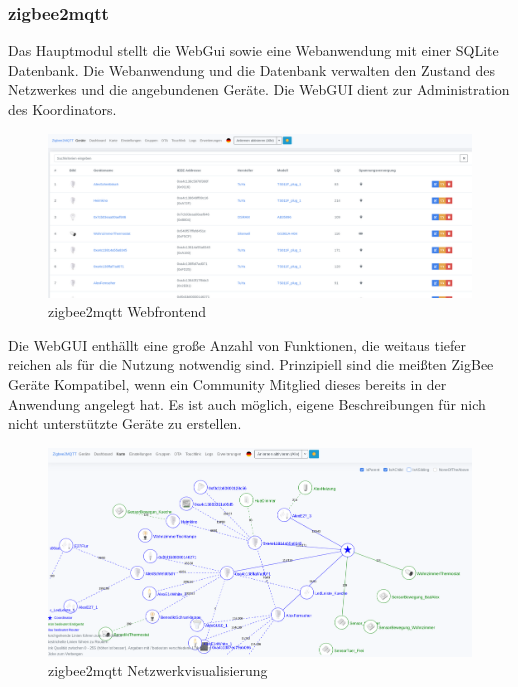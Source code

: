 \subsubsection{zigbee2mqtt}

Das Hauptmodul stellt die WebGui sowie eine Webanwendung mit einer SQLite Datenbank. Die Webanwendung und die Datenbank
verwalten den Zustand des Netzwerkes und die angebundenen Geräte. Die WebGUI dient zur Administration des Koordinators. 

\begin{figure}[H]
  \centering
  \includegraphics[width=1\textwidth]{media/z2m.png}
  \caption{zigbee2mqtt Webfrontend}
\end{figure}

Die WebGUI enthällt eine große Anzahl von Funktionen, die weitaus tiefer reichen als für die Nutzung notwendig sind.
Prinzipiell sind die meißten ZigBee Geräte Kompatibel, wenn ein Community Mitglied dieses bereits in der Anwendung
angelegt hat. Es ist auch möglich, eigene Beschreibungen für nich nicht unterstützte Geräte zu erstellen.\\

\begin{figure}[H]
  \centering
  \includegraphics[width=1\textwidth]{media/z2m-map.png}
  \caption{zigbee2mqtt Netzwerkvisualisierung}
\end{figure}

